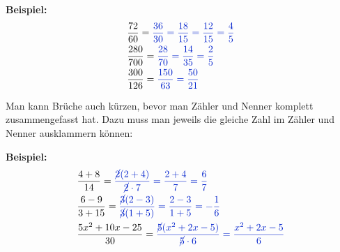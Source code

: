 \textbf{Beispiel:}
\begin{align*}
	&\frac{72}{60}=\textcolor{loes}{\frac{36}{30}=\frac{18}{15}=\frac{12}{15}=\frac{4}{5}}\\
	&\frac{280}{700}=\textcolor{loes}{\frac{28}{70}=\frac{14}{35}=\frac{2}{5}}\\
	&\frac{300}{126}=\textcolor{loes}{\frac{150}{63}=\frac{50}{21}}
\end{align*}

Man kann Brüche auch kürzen, bevor man Zähler und Nenner komplett zusammengefasst hat. Dazu muss man jeweils die gleiche Zahl im Zähler und Nenner ausklammern können:

\textbf{Beispiel:}
\begin{align*}
	&\frac{4+8}{14}=\textcolor{loes}{\frac{\cancel{2}(2+4)}{\cancel{2}\cdot 7}=\frac{2+4}{7}=\frac{6}{7}}\\
	&\frac{6-9}{3+15}=\textcolor{loes}{\frac{\cancel{3}(2-3)}{\cancel{3}(1+5)}=\frac{2-3}{1+5}=-\frac{1}{6}}\\
	&\frac{5x^2+10x-25}{30}=\textcolor{loes}{\frac{\cancel{5}(x^2+2x-5)}{\cancel{5}\cdot 6}=\frac{x^2+2x-5}{6}}
\end{align*}

